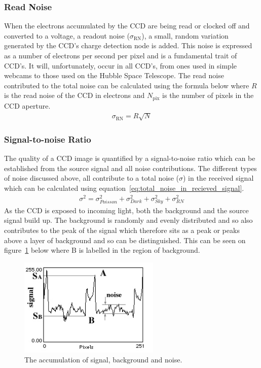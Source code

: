 		\subsubsection{Read Noise} %
		\label{ssub:read_noise}
			When the electrons accumulated by the CCD are being read or clocked off and converted to a voltage, a readout noise ($\sigma_\text{RN}$), a small, random variation generated by the CCD's charge detection node is added. This noise is expressed as a number of electrons per second per pixel and is a fundamental trait of CCD's. It will, unfortunately, occur in all CCD's, from ones used in simple webcams to those used on the Hubble Space Telescope\cite{Understanding_CCD_Read_Noise}. The read noise contributed to the total noise can be calculated using the formula below where $R$ is the read noise of the CCD in electrons and $N_\text{pix}$ is the number of pixels in the CCD aperture.
			\begin{align}
				\sigma_\text{RN} = R\sqrt{N}
			\end{align}

		\subsubsection{Signal-to-noise Ratio} %
		\label{ssub:signal_to_noise_ratio}
			The quality of a CCD image is quantified by a signal-to-noise ratio which can be established from the source signal and all noise contributions. The different types of noise discussed above, all contribute to a total noise ($\sigma$) in the received signal which can be calculated using equation~\ref{eq:total_noise_in_recieved_signal}.
			\begin{align}
				\sigma^{2} = \sigma_{Poisson}^{2} + \sigma_{Dark}^{2} + \sigma_{Sky}^{2} + \sigma_{RN}^{2} \label{eq:total_noise_in_recieved_signal}
			\end{align}
			As the CCD is exposed to incoming light, both the background and the source signal build up. The background is randomly and evenly distributed and so also contributes to the peak of the signal which therefore sits as a peak or peaks above a layer of background and so can be distinguished. This can be seen on figure~\ref{fig:signal_noise_accumulation} below where B is labelled in the region of background\cite{Signal_to_Noise_Ratio}.
			\begin{figure}[H]
				\centering
				\includegraphics[width=0.6\textwidth]{../Images/SNR.png}
				\caption{The accumulation of signal, background and noise.\label{fig:signal_noise_accumulation}}
			\end{figure}


